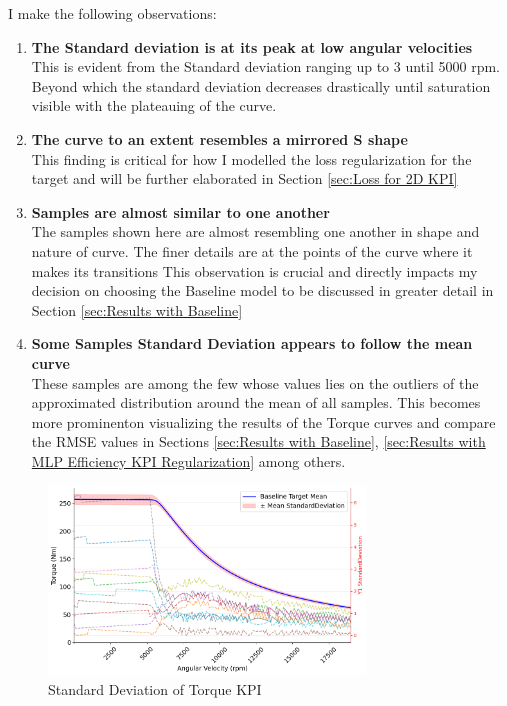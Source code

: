 \documentclass{report} %
\begin{document}
I make the following observations:
\begin{enumerate}[nosep]
    \item \textbf{The Standard deviation is at its peak at low angular velocities}\\
    This is evident from the Standard deviation ranging up to 3 until 5000 rpm. Beyond which the standard deviation decreases drastically until 
    saturation visible with the plateauing of the curve.
    \item \textbf{The curve to an extent resembles a mirrored S shape}\\           
    This finding is critical for how I modelled the loss regularization for the target and will be further elaborated in Section \ref{sec:Loss for 2D KPI}
    \item \textbf{Samples are almost similar to one another}\\
    The samples shown here are almost resembling one another in shape and nature of curve. The finer details are at the points of the curve where it makes its transitions 
    This observation is crucial and directly impacts my decision on choosing the Baseline model to be discussed in greater detail in Section \ref{sec:Results with Baseline}
    \item \textbf{Some Samples Standard Deviation appears to follow the mean curve}\\
    These samples are among the few whose values lies on the outliers of the approximated distribution around the mean of all samples. This becomes more 
    prominenton visualizing the results of the Torque curves and compare the \ac{RMSE} values in Sections \ref{sec:Results with Baseline}, 
    \ref{sec:Results with MLP Efficiency KPI Regularization}  among others.
\end{enumerate}

\begin{figure}[H]
    \centering
    \includegraphics[width=0.75\textwidth]{./ReportImages/StandardDeviation_Baseline_y1.png} 
    \caption{Standard Deviation of Torque KPI} 
    \label{fig:Standard Deviation of 2D KPI}
\end{figure}
\end{document}

